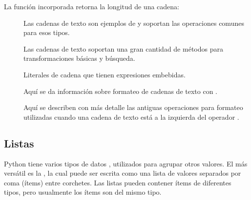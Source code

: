 \documentclass[a5paper,10pt,spanish]{sphinxmanual}
\begin{document}
\sphinxAtStartPar
La función incorporada  retorna la longitud de una cadena:

\begin{sphinxVerbatim}[commandchars=\\\{\}]
  
\end{sphinxVerbatim}


\nopagebreak

\begin{description}
\item[{}] \leavevmode
\sphinxAtStartPar
Las cadenas de texto son ejemplos de  y soportan las operaciones comunes para esos tipos.

\item[{}] \leavevmode
\sphinxAtStartPar
Las cadenas de texto soportan una gran cantidad de métodos para transformaciones básicas y búsqueda.

\item[{}] \leavevmode
\sphinxAtStartPar
Literales de cadena que tienen expresiones embebidas.

\item[{}] \leavevmode
\sphinxAtStartPar
Aquí se da información sobre formateo de cadenas de texto con .

\item[{}] \leavevmode
\sphinxAtStartPar
Aquí se describen con más detalle las antiguas operaciones para formateo utilizadas cuando una cadena de texto está a la izquierda del operador \sphinxcode{\sphinxupquote{\%}}.

\end{description}




\subsection{Listas}
\label{\detokenize{tutorial/introduction:lists}}\label{\detokenize{tutorial/introduction:tut-lists}}
\sphinxAtStartPar
Python tiene varios tipos de datos , utilizados para agrupar otros valores. El más versátil es la , la cual puede ser escrita como una lista de valores separados por coma (ítems) entre corchetes. Las listas pueden contener ítems de diferentes tipos, pero usualmente los ítems son del mismo tipo.
\end{document}
